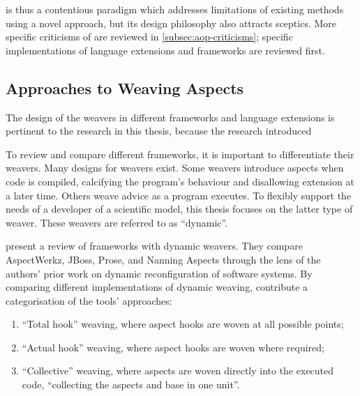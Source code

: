 \Aop{} is thus a contentious paradigm which addresses limitations
of existing methods using a novel approach, but its design philosophy also
attracts sceptics. More specific criticisms of \aop{} are reviewed in
\cref{subsec:aop-criticisms}; specific implementations of \aop{} language
extensions and frameworks are reviewed first.


\subsection{Approaches to Weaving Aspects}
\label{sec:dynamic_aop_review}

The design of the weavers in different \aspectorientation{} frameworks and
language extensions is pertinent to the research in this thesis, because the
research introduced 

To review and compare different \aop{} frameworks, it is important to
differentiate their weavers. Many designs for weavers exist. Some weavers
introduce aspects when code is compiled, calcifying the program's behaviour and
disallowing extension at a later time. Others weave advice as a program
executes. To flexibly support the needs of a developer of a scientific model,
this thesis focuses on the latter type of weaver. These weavers are referred to
as ``dynamic''.

\citet{dynamicAOchitchyan} present a review of \aspectorientation{} frameworks
with dynamic weavers. They compare AspectWerkz, JBoss, Prose, and Nanning
Aspects through the lens of the authors' prior work on dynamic reconfiguration
of software systems. By comparing different implementations of dynamic weaving,
\citeauthor{dynamicAOchitchyan} contribute a categorisation of the tools'
approaches: 

\begin{enumerate}
\item ``Total hook'' weaving, where aspect hooks are woven at all possible
points;
\item ``Actual hook'' weaving, where aspect hooks are woven where required;
\item ``Collective'' weaving, where aspects are woven directly into the executed
code, ``collecting the aspects and base in one unit''.
\end{enumerate}


